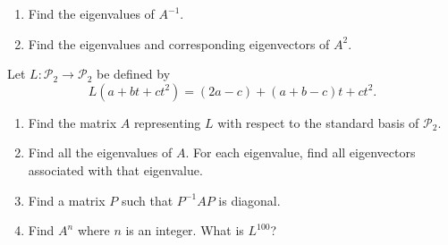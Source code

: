 \documentclass[12pt]{article}
\theoremstyle{remark}
\newtheorem*{solution}{Solution}
\renewcommand{\P}{\mathcal{P}}
\newcommand{\inv}{^{-1}}
\renewcommand{\=}{&=&}
\newcommand{\<}{\langle}
\renewcommand{\>}{\rangle}
\begin{document}
\begin{problems}
\begin{enumerate}
	\item Find the eigenvalues of $A\inv$.
	
	
	\item Find the eigenvalues and corresponding eigenvectors of $A^2$.
	
\end{enumerate}



\item  
Let $L : \P_2 \to \P_2$ be defined by $$L(a+bt+ct^2) = (2a-c) + (a+b-c) t + c t^2.$$
\begin{enumerate}
	\item Find the matrix $A$ representing $L$ with respect to the standard basis of $\P_2$.
	
	
	\item Find all the eigenvalues of $A$. For each eigenvalue, find all eigenvectors 
	associated with that eigenvalue.
	
	
	\item Find a matrix $P$ such that $P\inv AP$ is diagonal.
	
	
	\item Find $A^n$ where $n$ is an integer. What is $L^{100}$?
	

\end{enumerate}
\end{problems}
\end{document}

